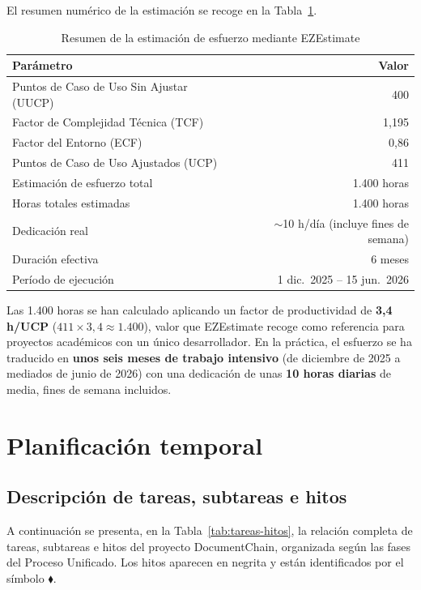 \documentclass[11pt, a4paper]{article}
\begin{document}
El resumen numérico de la estimación se recoge en la Tabla~\ref{tab:estimacion-final}.
\begin{table}[H]
\centering
\begin{tabular}{|l|r|}
\hline
\textbf{Parámetro} & \textbf{Valor} \\
\hline
Puntos de Caso de Uso Sin Ajustar (UUCP) & 400 \\
\hline
Factor de Complejidad Técnica (TCF) & 1{,}195 \\
\hline
Factor del Entorno (ECF) & 0{,}86 \\
\hline
Puntos de Caso de Uso Ajustados (UCP) & 411 \\
\hline
Estimación de esfuerzo total & 1.400 horas \\
\hline
Horas totales estimadas & 1.400 horas \\
\hline
Dedicación real & $\sim$10 h/día (incluye fines de semana) \\
\hline
Duración efectiva & 6 meses \\
\hline
Período de ejecución & 1 dic.\ 2025 -- 15 jun.\ 2026 \\
\hline
\end{tabular}
\caption{Resumen de la estimación de esfuerzo mediante EZEstimate}\label{tab:estimacion-final}
\end{table}

Las 1.400 horas se han calculado aplicando un factor de productividad de \textbf{3,4 h/UCP} ($411 \times 3{,}4 \approx 1.400$), valor que EZEstimate recoge como referencia para proyectos académicos con un único desarrollador. En la práctica, el esfuerzo se ha traducido en \textbf{unos seis meses de trabajo intensivo} (de diciembre de 2025 a mediados de junio de 2026) con una dedicación de unas \textbf{10 horas diarias} de media, fines de semana incluidos.

\section{Planificación temporal}

\subsection{Descripción de tareas, subtareas e hitos}

A continuación se presenta, en la Tabla~\ref{tab:tareas-hitos}, la relación completa de tareas, subtareas e hitos del proyecto DocumentChain, organizada según las fases del Proceso Unificado. Los hitos aparecen en negrita y están identificados por el símbolo $\blacklozenge$.
\end{document}
